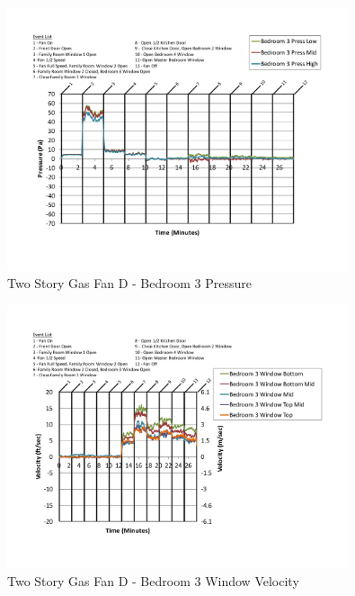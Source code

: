 \documentclass{article}
\begin{document}
\begin{appendices}
	\begin{figure}[H]
		\centering
		\includegraphics[height=3.05in,trim=0.67in 1.1in 0.67in 0.8in,clip=true]{0_Images/Results_Charts/ColdFlow/Two_Story/Gas/D/Bedroom_3_Pressure.pdf}
		\caption{Two Story Gas Fan D - Bedroom 3 Pressure}
	\end{figure}
 

	\begin{figure}[H]
		\centering
		\includegraphics[height=3.05in,trim=0.67in 1.1in 0.67in 0.8in,clip=true]{0_Images/Results_Charts/ColdFlow/Two_Story/Gas/D/Bedroom_3_Window_Velocity.pdf}
		\caption{Two Story Gas Fan D - Bedroom 3 Window Velocity}
	\end{figure}
 
	\clearpage


\end{appendices}
\end{document}
